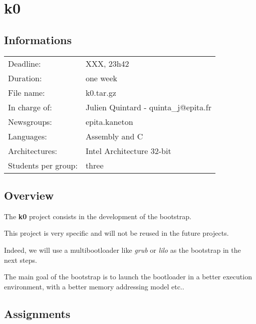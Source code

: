 
%
%

\section{k0}

%
%

\subsection{Informations}

\begin{tabular}{p{7cm}l}
Deadline: & XXX, 23h42 \\
Duration: & one week \\
File name: & k0.tar.gz \\
In charge of: & Julien Quintard - \small{quinta\_j@epita.fr} \\
Newsgroups: & epita.kaneton \\
Languages: & Assembly and C \\
Architectures: & Intel Architecture 32-bit \\
Students per group: & three \\
\end{tabular}

%
%

\subsection{Overview}

The \textbf{k0} project consists in the development of the bootstrap.

This project is very specific and will not be reused in the future
projects.

Indeed, we will use a multibootloader like \textit{grub} or \textit{lilo}
as the bootstrap in the next steps.

The main goal of the bootstrap is to launch the bootloader in a better
execution environment, with a better memory addressing model etc..

%
%

\subsection{Assignments}

